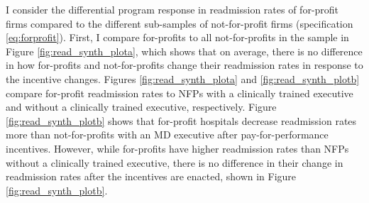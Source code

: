 \documentclass[12pt]{article}
\begin{document}
     I consider the differential program response in readmission rates of for-profit firms compared to the different sub-samples of not-for-profit firms (specification \ref{eq:forprofit}). First, I compare for-profits to all not-for-profits in the sample in Figure \ref{fig:read_synth_plota}, which shows that on average, there is no difference in how for-profits and not-for-profits change their readmission rates in response to the incentive changes. Figures \ref{fig:read_synth_plota} and \ref{fig:read_synth_plotb} compare for-profit readmission rates to NFPs with a clinically trained executive and without a clinically trained executive, respectively. Figure \ref{fig:read_synth_plotb} shows that for-profit hospitals decrease readmission rates more than not-for-profits with an MD executive after pay-for-performance incentives. However, while for-profits have higher readmission rates than NFPs without a clinically trained executive, there is no difference in their change in readmission rates after the incentives are enacted, shown in Figure \ref{fig:read_synth_plotb}. 
\end{document}
